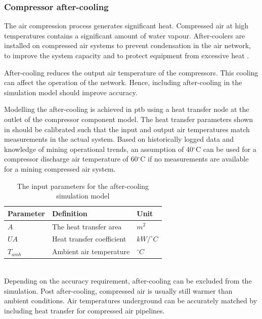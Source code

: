 		\subsubsection{Compressor after-cooling}
		The air compression process generates significant heat. Compressed air at high temperatures contains a significant amount of water vapour. After-coolers are installed on compressed air systems to prevent condensation in the air network, to improve the system capacity and to protect equipment from excessive heat \cite{schroeder2009energy}.
		\par 
		After-cooling reduces the output air temperature of the compressors. This cooling can affect the operation of the network. Hence, including after-cooling in the simulation model should improve accuracy.
		\par
		Modelling the after-cooling is achieved in \gls{ptb} using a heat transfer node at the outlet of the compressor component model. The heat transfer parameters shown in  should be calibrated such that the input and output air temperatures match measurements in the actual system. Based on historically logged data and knowledge of mining operational trends, an assumption of 40$^\circ$C can be used for a compressor discharge air temperature of 60$^\circ$C if no measurements are available for a mining compressed air system. 
\\
		\begin{table}[h!]
			\caption{The input parameters for the after-cooling simulation model}
			\centering
			\begin{tabular}{lll}
				\hline 
				Parameter \hspace{1cm} & Definition \hspace{4cm} & Unit \\
				\hline
				$A$ & The heat transfer area & $m^2$ \\
				$UA$ & Heat transfer coefficient & $kW/^{\circ} C$ \\
				$T_{amb}$ & Ambient air temperature & $^{\circ} C$ \\
				\hline
			\end{tabular}
		\label{table: After cooling inputs}
		\end{table}
	\\
	Depending on the accuracy requirement, after-cooling can be excluded from the simulation. Post after-cooling, compressed air is usually still warmer than ambient conditions. Air temperatures underground can be accurately matched by including heat transfer for compressed air pipelines.
